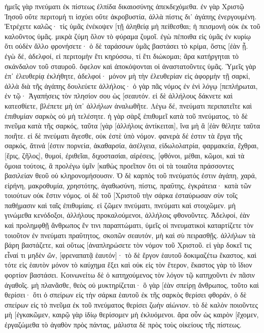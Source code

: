 ἡμεῖς γὰρ πνεύματι ἐκ πίστεως ἐλπίδα δικαιοσύνης ἀπεκδεχόμεθα. 
ἐν γὰρ Χριστῷ Ἰησοῦ οὔτε περιτομή τι ἰσχύει οὔτε ἀκροβυστία, ἀλλὰ πίστις δι᾽ ἀγάπης ἐνεργουμένη. 
Ἐτρέχετε καλῶς· τίς ὑμᾶς ἐνέκοψεν [τῇ ἀληθείᾳ μὴ πείθεσθαι; 
ἡ πεισμονὴ οὐκ ἐκ τοῦ καλοῦντος ὑμᾶς. 
μικρὰ ζύμη ὅλον τὸ φύραμα ζυμοῖ. 
ἐγὼ πέποιθα εἰς ὑμᾶς ἐν κυρίῳ ὅτι οὐδὲν ἄλλο φρονήσετε· ὁ δὲ ταράσσων ὑμᾶς βαστάσει τὸ κρίμα, ὅστις [ἐὰν ᾖ. 
ἐγὼ δέ, ἀδελφοί, εἰ περιτομὴν ἔτι κηρύσσω, τί ἔτι διώκομαι; ἄρα κατήργηται τὸ σκάνδαλον τοῦ σταυροῦ. 
ὄφελον καὶ ἀποκόψονται οἱ ἀναστατοῦντες ὑμᾶς. 
Ὑμεῖς γὰρ ἐπ᾽ ἐλευθερίᾳ ἐκλήθητε, ἀδελφοί· μόνον μὴ τὴν ἐλευθερίαν εἰς ἀφορμὴν τῇ σαρκί, ἀλλὰ διὰ τῆς ἀγάπης δουλεύετε ἀλλήλοις· 
ὁ γὰρ πᾶς νόμος ἐν ἑνὶ λόγῳ [πεπλήρωται, ἐν τῷ· Ἀγαπήσεις τὸν πλησίον σου ὡς [σεαυτόν. 
εἰ δὲ ἀλλήλους δάκνετε καὶ κατεσθίετε, βλέπετε μὴ ὑπ᾽ ἀλλήλων ἀναλωθῆτε. 
Λέγω δέ, πνεύματι περιπατεῖτε καὶ ἐπιθυμίαν σαρκὸς οὐ μὴ τελέσητε. 
ἡ γὰρ σὰρξ ἐπιθυμεῖ κατὰ τοῦ πνεύματος, τὸ δὲ πνεῦμα κατὰ τῆς σαρκός, ταῦτα [γὰρ [ἀλλήλοις ἀντίκειται], ἵνα μὴ ἃ [ἐὰν θέλητε ταῦτα ποιῆτε. 
εἰ δὲ πνεύματι ἄγεσθε, οὐκ ἐστὲ ὑπὸ νόμον. 
φανερὰ δέ ἐστιν τὰ ἔργα τῆς σαρκός, ἅτινά [ἐστιν πορνεία, ἀκαθαρσία, ἀσέλγεια, 
εἰδωλολατρία, φαρμακεία, ἔχθραι, [ἔρις, ζῆλος], θυμοί, ἐριθεῖαι, διχοστασίαι, αἱρέσεις, 
[φθόνοι, μέθαι, κῶμοι, καὶ τὰ ὅμοια τούτοις, ἃ προλέγω ὑμῖν [καθὼς προεῖπον ὅτι οἱ τὰ τοιαῦτα πράσσοντες βασιλείαν θεοῦ οὐ κληρονομήσουσιν. 
Ὁ δὲ καρπὸς τοῦ πνεύματός ἐστιν ἀγάπη, χαρά, εἰρήνη, μακροθυμία, χρηστότης, ἀγαθωσύνη, πίστις, 
πραΰτης, ἐγκράτεια· κατὰ τῶν τοιούτων οὐκ ἔστιν νόμος. 
οἱ δὲ τοῦ [Χριστοῦ τὴν σάρκα ἐσταύρωσαν σὺν τοῖς παθήμασιν καὶ ταῖς ἐπιθυμίαις. 
εἰ ζῶμεν πνεύματι, πνεύματι καὶ στοιχῶμεν. 
μὴ γινώμεθα κενόδοξοι, ἀλλήλους προκαλούμενοι, ἀλλήλοις φθονοῦντες. 
Ἀδελφοί, ἐὰν καὶ προλημφθῇ ἄνθρωπος ἔν τινι παραπτώματι, ὑμεῖς οἱ πνευματικοὶ καταρτίζετε τὸν τοιοῦτον ἐν πνεύματι πραΰτητος, σκοπῶν σεαυτόν, μὴ καὶ σὺ πειρασθῇς. 
ἀλλήλων τὰ βάρη βαστάζετε, καὶ οὕτως [ἀναπληρώσετε τὸν νόμον τοῦ Χριστοῦ. 
εἰ γὰρ δοκεῖ τις εἶναί τι μηδὲν ὤν, [φρεναπατᾷ ἑαυτόν]· 
τὸ δὲ ἔργον ἑαυτοῦ δοκιμαζέτω ἕκαστος, καὶ τότε εἰς ἑαυτὸν μόνον τὸ καύχημα ἕξει καὶ οὐκ εἰς τὸν ἕτερον, 
ἕκαστος γὰρ τὸ ἴδιον φορτίον βαστάσει. 
Κοινωνείτω δὲ ὁ κατηχούμενος τὸν λόγον τῷ κατηχοῦντι ἐν πᾶσιν ἀγαθοῖς. 
μὴ πλανᾶσθε, θεὸς οὐ μυκτηρίζεται· ὃ γὰρ [ἐὰν σπείρῃ ἄνθρωπος, τοῦτο καὶ θερίσει· 
ὅτι ὁ σπείρων εἰς τὴν σάρκα ἑαυτοῦ ἐκ τῆς σαρκὸς θερίσει φθοράν, ὁ δὲ σπείρων εἰς τὸ πνεῦμα ἐκ τοῦ πνεύματος θερίσει ζωὴν αἰώνιον. 
τὸ δὲ καλὸν ποιοῦντες μὴ [ἐγκακῶμεν, καιρῷ γὰρ ἰδίῳ θερίσομεν μὴ ἐκλυόμενοι. 
ἄρα οὖν ὡς καιρὸν [ἔχομεν, ἐργαζώμεθα τὸ ἀγαθὸν πρὸς πάντας, μάλιστα δὲ πρὸς τοὺς οἰκείους τῆς πίστεως. 
